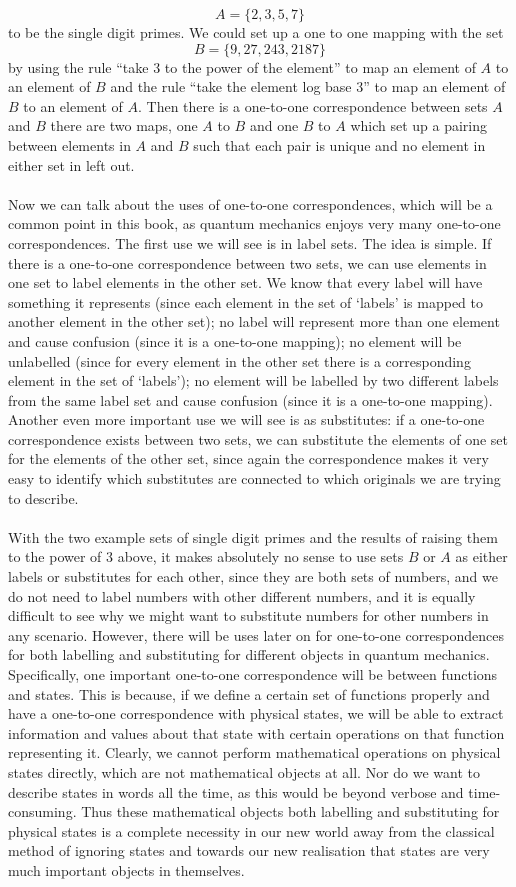 $$
A=\{2,3,5,7\}
$$
to be the single digit primes. We could set up a one to one mapping with the set 
$$
B=\{9,27,243,2187\}
$$
by using the rule ``take 3 to the power of the element'' to map an element of $A$ to an element of $B$ and the rule ``take the element log base 3'' to map an element of $B$ to an element of $A$. Then there is a one-to-one correspondence between sets $A$ and $B$ there are two maps, one $A$ to $B$ and one $B$ to $A$ which set up a pairing between elements in $A$ and $B$ such that each pair is unique and no element in either set in left out.
\\\\
Now we can talk about the uses of one-to-one correspondences, which will be a common point in this book, as quantum mechanics enjoys very many one-to-one correspondences. The first use we will see is in label sets. The idea is simple. If there is a one-to-one correspondence between two sets, we can use elements in one set to label elements in the other set. We know that every label will have something it represents (since each element in the set of `labels' is mapped to another element in the other set); no label will represent more than one element and cause confusion (since it is a one-to-one mapping); no element will be unlabelled (since for every element in the other set there is a corresponding element in the set of `labels'); no element will be labelled by two different labels from the same label set and cause confusion (since it is a one-to-one mapping). Another even more important use we will see is as substitutes: if a one-to-one correspondence exists between two sets, we can substitute the elements of one set for the elements of the other set, since again the correspondence makes it very easy to identify which substitutes are connected to which originals we are trying to describe.
\\\\
With the two example sets of single digit primes and the results of raising them to the power of 3  above, it makes absolutely no sense to use sets $B$ or $A$ as either labels or substitutes for each other, since they are both sets of numbers, and we do not need to label numbers with other different numbers, and it is equally difficult to see why we might want to substitute numbers for other numbers in any scenario. However, there will be uses later on for one-to-one correspondences for both labelling and substituting for different objects in quantum mechanics. Specifically, one important one-to-one correspondence will be between functions and states. This is because, if we define a certain set of functions properly and have a one-to-one correspondence with physical states, we will be able to extract information and values about that state with certain operations on that function representing it. Clearly, we cannot perform mathematical operations on physical states directly, which are not mathematical objects at all. Nor do we want to describe states in words all the time, as this would be beyond verbose and time-consuming. Thus these mathematical objects both labelling and substituting for physical states is a complete necessity in our new world away from the classical method of ignoring states and towards our new realisation that states are very much important objects in themselves.

